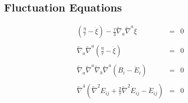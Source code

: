 \documentclass[10pt,letterpaper]{article}
\numberwithin{equation}{section}
\begin{document}
\subsection{Fluctuation Equations}
\begin{eqnarray}
\left(\frac{\eta}{\tau}-\dot\xi\right) -\frac{\tau}{3}\tilde\nabla_a\tilde\nabla^a \xi &=&0
\\ \nonumber\\
\tilde\nabla_a\tilde\nabla^a \left( \frac{\eta}{\tau}-\dot\xi\right) &=&0
\\ \nonumber\\
\tilde\nabla_a\tilde\nabla^a\tilde\nabla_b\tilde\nabla^a (B_i-\dot E_i) &=&0
\\ \nonumber\\
\tilde\nabla^4\left(
\tilde\nabla^2 E_{ij} +\frac{2}{\tau} \tilde\nabla^2 \dot E_{ij} -\ddot E_{ij} \right) &=& 0
\end{eqnarray}
\end{document}
